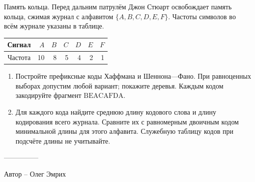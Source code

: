 \question
Память кольца. Перед дальним патрулём Джон Стюарт освобождает память кольца, сжимая журнал с алфавитом $\{A,B,C,D,E,F\}$. Частоты символов во всём журнале указаны в таблице.
\begin{center}\begin{tabular}{c|rrrrrr}Сигнал&$A$&$B$&$C$&$D$&$E$&$F$\\\hline Частота&10&8&5&4&2&1\end{tabular}\end{center}
\begin{enumerate}
\item Постройте префиксные коды Хаффмана и Шеннона---Фано. При равноценных выборах допустим любой вариант; покажите деревья. Каждым кодом закодируйте фрагмент $\mathrm{BEACAFDA}$.
\item Для каждого кода найдите среднюю длину кодового слова и длину кодирования всего журнала. Сравните их с равномерным двоичным кодом минимальной длины для этого алфавита. Служебную таблицу кодов при подсчёте длины не учитывайте.
\end{enumerate}

---------------

Автор -- Олег Эмрих
